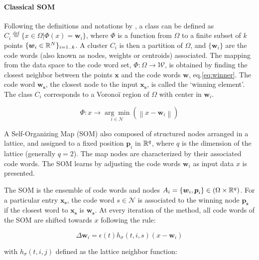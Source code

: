 \documentclass[utf8]{frontiersSCNS} %
\begin{document}
\paragraph{Classical SOM}

Following the definitions and notations by \citep{Villmann2006}, a class can be defined as $C_i\overset{\text{def}}{=} \{x\in\Omega | \Phi(x)=\boldsymbol{w}_i\}$, where $\Phi$ is a function from $\Omega$ to a finite subset of $k$ points $\{\boldsymbol{w}_i\in\Bbb R^N\}_{i=1..k}$. A cluster $C_i$ is then a partition of $\Omega$, and $\{\boldsymbol{w}_i\}$ are the code words (also known as nodes, weights or centroids) associated. The mapping from the data space to the code word set, $\Phi: \Omega\rightarrow\mathcal{W}$, is obtained by finding the closest neighbor between the points $\boldsymbol{x}$ and the code words $\boldsymbol{w}$, eq.\eqref{eq:winner}. The code word $\boldsymbol{w_s}$, the closest node to the input $\boldsymbol{x_s}$, is called the `winning element'. The class $C_i$ corresponds to a Vorono\"i region of $\Omega$ with center in $\boldsymbol{w}_i$.

\begin{equation}
\Phi: x \rightarrow  \underset{i\in\mathcal{N}}{\arg\min}\left( \left\lVert x - \boldsymbol{w}_i \right\rVert \right) \label{eq:winner}
\end{equation}

A Self-Organizing Map (SOM) also composed of structured nodes arranged in a lattice, and assigned to a fixed position $\boldsymbol{p}_i$ in $\Bbb R^q$, where $q$ is the dimension of the lattice (generally $q=2$). The map nodes are characterized by their associated code words. The SOM learns by adjusting the code words $\boldsymbol{w}_i$ as input data $x$ is presented.

The SOM is the ensemble of code words and nodes $A_i = \{ \boldsymbol{w}_i, \boldsymbol{p}_i\} \in (\Omega \times \Bbb R^q)$. For a particular entry $\boldsymbol{x_s}$, the code word $s \in \mathcal{N}$ is associated to the winning node $\boldsymbol{p_s}$ if the closest word to $\boldsymbol{x_s}$ is $\boldsymbol{w_s}$. At every iteration of the method, all code words of the SOM are shifted towards $x$ following the rule:

\begin{equation}
\Delta \boldsymbol{w}_i = \epsilon(t)h_\sigma(t,i,s)(x-\boldsymbol{w}_i) \label{eq:learnsom}
\end{equation}

with $h_\sigma(t,i,j)$ defined as the lattice neighbor function:
\end{document}
